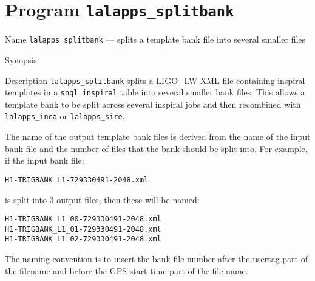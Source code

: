 \section{Program \texttt{lalapps\_splitbank}}
\label{program:lalapps-splitbank}

\begin{entry}
\item[Name]
\verb$lalapps_splitbank$ --- splits a template bank file into several smaller
files

\item[Synopsis]
 \newline \hspace*{0.5in}
  \newline \hspace*{0.5in}
 \newline \hspace*{0.5in}
  \newline \hspace*{0.5in}
  \newline \hspace*{0.5in}
 \newline \hspace*{0.5in}
 \newline \hspace*{0.5in}
 \newline \hspace*{0.5in}
 \newline \hspace*{0.5in}

\item[Description] 
\verb$lalapps_splitbank$ splits a LIGO\_LW XML file containing inspiral
templates in a \texttt{sngl\_inspiral} table into several smaller bank
files. This allows a template bank to be split across several inspiral 
jobs and then recombined with \texttt{lalapps\_inca} or
\texttt{lalapps\_sire}.

The name of the output template bank files is derived from the name of 
the input bank file and the number of files that the bank should be split
into. For example, if the input bank file:\\
\begin{center}
\texttt{H1-TRIGBANK\_L1-729330491-2048.xml}\\
\end{center}
is split into 3 output files, then these will be named:\\
\begin{center}
\texttt{H1-TRIGBANK\_L1\_00-729330491-2048.xml}\\
\texttt{H1-TRIGBANK\_L1\_01-729330491-2048.xml}\\
\texttt{H1-TRIGBANK\_L1\_02-729330491-2048.xml}\\
\end{center}
The naming convention is to insert the bank file number after the usertag part
of the filename and before the GPS start time part of the file name.


\end{entry}
